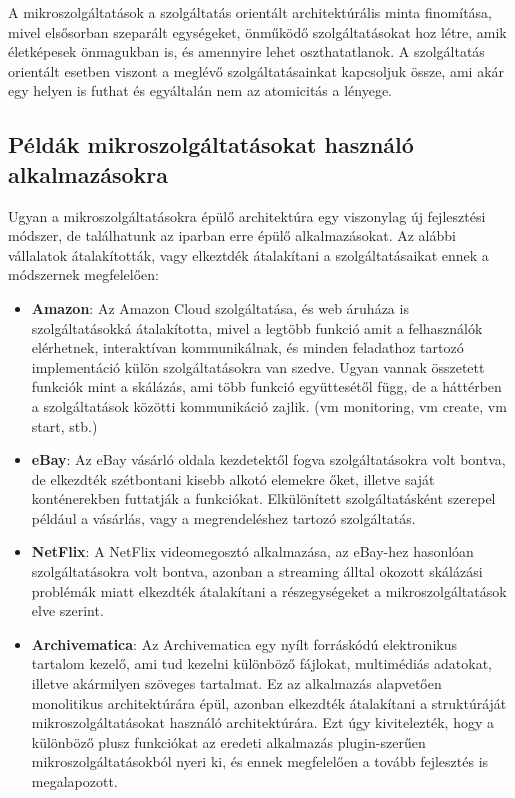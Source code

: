 \documentclass[11pt,magyar,a4paper,twoside,]{report}
\begin{document}
A mikroszolgáltatások a szolgáltatás orientált architektúrális minta
finomítása, mivel elsősorban szeparált egységeket, önműködő
szolgáltatásokat hoz létre, amik életképesek önmagukban is, és amennyire
lehet oszthatatlanok. A szolgáltatás orientált esetben viszont a meglévő
szolgáltatásainkat kapcsoljuk össze, ami akár egy helyen is futhat és
egyáltalán nem az atomicitás a lényege.

\subsection{Példák mikroszolgáltatásokat használó
alkalmazásokra}\label{puxe9lduxe1k-mikroszolguxe1ltatuxe1sokat-hasznuxe1luxf3-alkalmazuxe1sokra}

Ugyan a mikroszolgáltatásokra épülő architektúra egy viszonylag új
fejlesztési módszer, de találhatunk az iparban erre épülő
alkalmazásokat. Az alábbi vállalatok átalakították, vagy elkeztdék
átalakítani a szolgáltatásaikat ennek a módszernek megfelelően:

\begin{itemize}
\item
  \textbf{Amazon}: Az Amazon Cloud szolgáltatása, és web áruháza is
  szolgáltatásokká átalakította, mivel a legtöbb funkció amit a
  felhasználók elérhetnek, interaktívan kommunikálnak, és minden
  feladathoz tartozó implementáció külön szolgáltatásokra van szedve.
  Ugyan vannak összetett funkciók mint a skálázás, ami több funkció
  együttesétől függ, de a háttérben a szolgáltatások közötti
  kommunikáció zajlik. (vm monitoring, vm create, vm start, stb.)
\item
  \textbf{eBay}: Az eBay vásárló oldala kezdetektől fogva
  szolgáltatásokra volt bontva, de elkezdték szétbontani kisebb alkotó
  elemekre őket, illetve saját konténerekben futtatják a funkciókat.
  Elkülönített szolgáltatásként szerepel például a vásárlás, vagy a
  megrendeléshez tartozó szolgáltatás.
\item
  \textbf{NetFlix}: A NetFlix videomegosztó alkalmazása, az eBay-hez
  hasonlóan szolgáltatásokra volt bontva, azonban a streaming álltal
  okozott skálázási problémák miatt elkezdték átalakítani a
  részegységeket a mikroszolgáltatások elve szerint.
\item
  \textbf{Archivematica}: Az Archivematica\citep{archivematica} egy
  nyílt forráskódú elektronikus tartalom kezelő, ami tud kezelni
  különböző fájlokat, multimédiás adatokat, illetve akármilyen szöveges
  tartalmat. Ez az alkalmazás alapvetően monolitikus architektúrára
  épül, azonban elkezdték átalakítani a struktúráját
  mikroszolgáltatásokat használó architektúrára. Ezt úgy kivitelezték,
  hogy a különböző plusz funkciókat az eredeti alkalmazás plugin-szerűen
  mikroszolgáltatásokból nyeri ki, és ennek megfelelően a tovább
  fejlesztés is megalapozott\citep{archivematica-wiki}.
\end{itemize}
\end{document}
